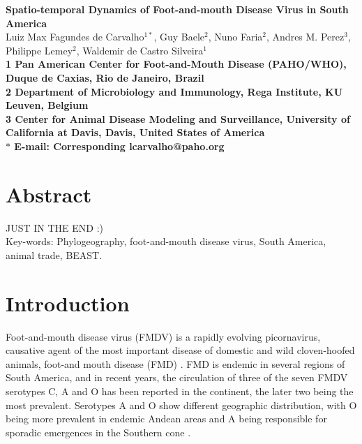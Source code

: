 \documentclass[10pt]{article}
\date{}
\begin{document}
\begin{flushleft}
{\Large
\textbf{Spatio-temporal Dynamics of Foot-and-mouth Disease Virus in South America}
}
\\
Luiz Max Fagundes de Carvalho$^{1\ast}$,
Guy Baele$^{2}$,
Nuno Faria$^{2}$,
Andres M. Perez$^{3}$,
Philippe Lemey$^{2}$,
Waldemir de Castro Silveira$^{1}$
\\
\bf{1} Pan American Center for Foot-and-Mouth Disease (PAHO/WHO), Duque de Caxias, Rio de Janeiro, Brazil
\\
\bf{2} Department of Microbiology and Immunology, Rega Institute, KU Leuven, Belgium
\\
\bf{3} Center for Animal Disease Modeling and Surveillance, University of California at Davis, Davis, United States of America
\\
$\ast$ E-mail: Corresponding lcarvalho@paho.org
\end{flushleft}

\section*{Abstract}

JUST IN THE END :)\\


Key-words: Phylogeography, foot-and-mouth disease virus, South America, animal trade, BEAST.

\section*{Introduction}

Foot-and-mouth disease virus (FMDV) is a rapidly evolving picornavirus, causative agent of the most important disease of domestic and wild cloven-hoofed animals, foot-and mouth disease (FMD) \cite{review}.
FMD is endemic in several regions of South America, and in recent years, the circulation of three of the seven FMDV serotypes C, A and O has been reported in the continent, the later two being the most prevalent.
Serotypes A and O show different  geographic distribution, with O being more prevalent in endemic Andean areas \cite{andean} and A being responsible for sporadic emergences in the Southern cone \cite{Perez2001,Malirat2012}.
\end{document}
